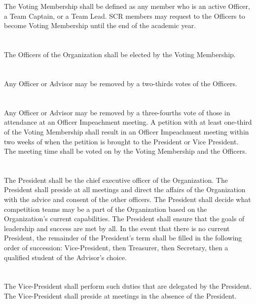 \documentclass[12pt]{cls/constitution}
\begin{document}
\section{}
The Voting Membership shall be defined as any member who is an active Officer, a Team Captain, or a Team Lead. SCR members may request to the Officers to become Voting Membership until the end of the academic year.

\section{}
The Officers of the Organization shall be elected by the Voting Membership.

\section{}
Any Officer or Advisor may be removed by a two-thirds votes of the Officers.

\section{}
Any Officer or Advisor may be removed by a three-fourths vote of those in attendance at an Officer Impeachment meeting. A petition with at least one-third of the Voting Membership shall result in an Officer Impeachment meeting within two weeks of when the petition is brought to the President or Vice President. The meeting time shall be voted on by the Voting Membership and the Officers.

\section{}
The President shall be the chief executive officer of the Organization.  The President shall preside at all meetings and direct the affairs of the Organization with the advice and consent of the other officers.  The President shall decide what competition teams may be a part of the Organization based on the Organization’s current capabilities. The President shall ensure that the goals of leadership and success are met by all. In the event that there is no current President, the remainder of the President’s term shall be filled in the following order of succession:  Vice-President, then Treasurer, then Secretary, then a qualified student of the Advisor’s choice.

\section{}
The Vice-President shall perform such duties that are delegated by the President.  The Vice-President shall preside at meetings in the absence of the President. 
\end{document}
